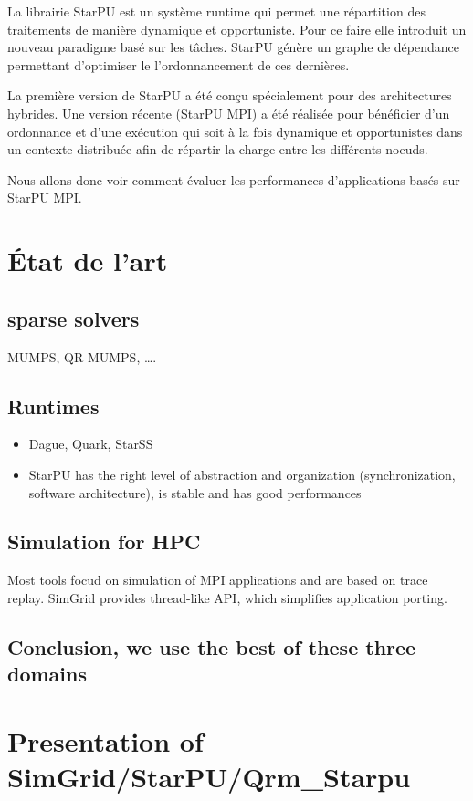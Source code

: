 \documentclass[smallextended]{svjour3}
\begin{document}
La librairie StarPU est un système runtime qui permet une
répartition des traitements de manière dynamique et opportuniste. 
Pour ce faire elle introduit un nouveau paradigme basé sur les
tâches. StarPU génère un graphe de dépendance permettant
d'optimiser le l'ordonnancement de ces dernières.

La première version de StarPU a été conçu spécialement pour des
architectures hybrides. Une version récente (StarPU MPI) a été
réalisée pour bénéficier d'un ordonnance et d'une exécution qui
soit à la fois dynamique et opportunistes dans un contexte
distribuée afin de répartir la charge entre les différents
noeuds.

Nous allons donc voir comment évaluer les performances
d'applications basés sur StarPU MPI.

\section{État de l'art}
\label{sec-2}
\subsection{sparse solvers}
\label{sec-2-1}
MUMPS, QR-MUMPS, \ldots{}.
\subsection{Runtimes}
\label{sec-2-2}
\begin{itemize}
\item Dague, Quark, StarSS
\item StarPU has the right level of abstraction and organization
(synchronization, software architecture), is stable and has good
performances
\end{itemize}
\subsection{Simulation for HPC}
\label{sec-2-3}
Most tools focud on simulation of MPI applications and
are based on trace replay. SimGrid provides thread-like API, which
simplifies application porting.
\subsection{Conclusion, we use the best of these three domains}
\label{sec-2-4}
\section{Presentation of SimGrid/StarPU/Qrm\_Starpu}
\label{sec-3}
\end{document}

